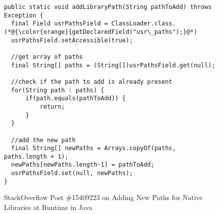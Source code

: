\begin{figure}[t]%
	\centering
\begin{lstlisting}[]
public static void addLibraryPath(String pathToAdd) throws Exception {
  final Field usrPathsField = ClassLoader.class.(*@{\color{orange}{getDeclaredField("usr\_paths");}@*)
  usrPathsField.setAccessible(true);

  //get array of paths
  final String[] paths = (String[])usrPathsField.get(null);

  //check if the path to add is already present
  for(String path : paths) {
      if(path.equals(pathToAdd)) {
          return;
      }
  }

  //add the new path
  final String[] newPaths = Arrays.copyOf(paths, paths.length + 1);
  newPaths[newPaths.length-1] = pathToAdd;
  usrPathsField.set(null, newPaths);
}
\end{lstlisting}
        \vspace{-16pt}
        \caption{StackOverflow Post \#15409223 on Adding New Paths for
          Native Libraries at Runtime in Java}
        \label{fig:example1}
\end{figure}
